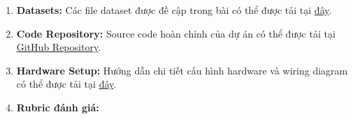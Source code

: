 \documentclass[12pt]{article}
\begin{document}
\newpage
\begin{appendices}

\begin{enumerate}
    \item \textbf{Datasets:} Các file dataset được đề cập trong bài có thể được tải tại \href{https://aivietnam.edu.vn/}{đây}.
    \item \textbf{Code Repository:} Source code hoàn chỉnh của dự án có thể được tải tại \href{https://github.com/aivietnam/gesture-relay-control}{GitHub Repository}.
    \item \textbf{Hardware Setup:} Hướng dẫn chi tiết cấu hình hardware và wiring diagram có thể được tải tại \href{https://aivietnam.edu.vn/}{đây}.
    
    \item \textbf{Rubric đánh giá:}


\end{enumerate}
\end{appendices}
\end{document}

